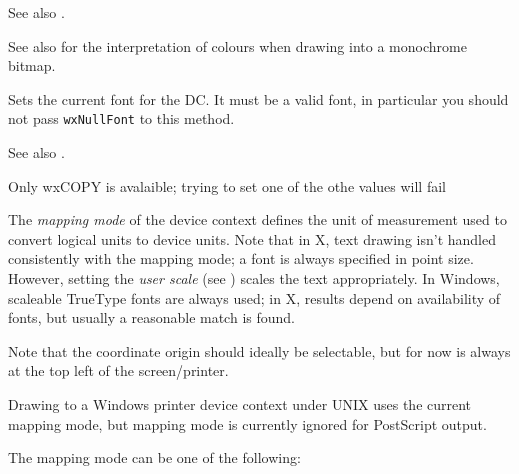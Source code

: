 See also .

See also  for the interpretation of colours
when drawing into a monochrome bitmap.

\label{wxsvgfiledcsetfont}


Sets the current font for the DC. It must be a valid font, in particular you
should not pass {\tt wxNullFont} to this method.

See also .

\label{wxsvgfiledcsetlogicalfunction}



Only wxCOPY is avalaible; trying to set one of the othe values will fail

\label{wxsvgfiledcsetmapmode}


The {\it mapping mode} of the device context defines the unit of
measurement used to convert logical units to device units. Note that
in X, text drawing isn't handled consistently with the mapping mode; a
font is always specified in point size. However, setting the {\it
user scale} (see ) scales the text appropriately. In
Windows, scaleable TrueType fonts are always used; in X, results depend
on availability of fonts, but usually a reasonable match is found.

Note that the coordinate origin should ideally be selectable, but for
now is always at the top left of the screen/printer.

Drawing to a Windows printer device context under UNIX
uses the current mapping mode, but mapping mode is currently ignored for
PostScript output.

The mapping mode can be one of the following:

\begin{twocollist}\itemsep=0pt
\end{twocollist}

